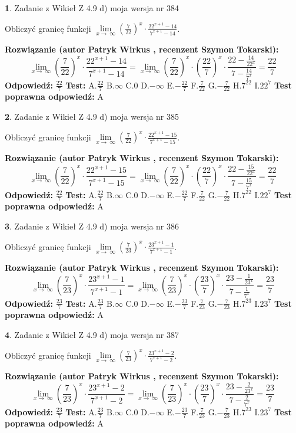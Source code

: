 \documentclass[12pt, a4paper]{article}
\theoremstyle{definition} %
\newtheorem{zad}{}
\newcommand{\zadStart}[1]{\begin{zad}#1\newline}
\newcommand{\zadStop}{\end{zad}}
\newcommand{\rozwStart}[2]{\noindent \textbf{Rozwiązanie (autor #1 , recenzent #2): }\newline}
\newcommand{\rozwStop}{\newline}
\newcommand{\odpStart}{\noindent \textbf{Odpowiedź:}\newline}
\newcommand{\odpStop}{\newline}
\newcommand{\testStart}{\noindent \textbf{Test:}\newline}
\newcommand{\testStop}{\newline}
\newcommand{\kluczStart}{\noindent \textbf{Test poprawna odpowiedź:}\newline}
\newcommand{\kluczStop}{\newline}
\begin{document}
\zadStart{Zadanie z Wikieł Z 4.9 d) moja wersja nr 384}


Obliczyć granicę funkcji  $\lim\limits_{x\to\ \infty}(\frac{7}{22})^{x}\cdot\frac{22^{x+1}-14}{7^{x+1}-14}$.
\zadStop
\rozwStart{Patryk Wirkus}{Szymon Tokarski}
$$\lim\limits_{x\to\ \infty}(\frac{7}{22})^{x}\cdot\frac{22^{x+1}-14}{7^{x+1}-14}=\lim\limits_{x\to\ \infty}(\frac{7}{22})^{x}\cdot(\frac{22}{7})^{x} \cdot \frac{22-\frac{14}{22^{x}}}{7-\frac{14}{7^{x}}} = \frac{22}{7}$$
\rozwStop
\odpStart
$\frac{22}{7}$
\odpStop
\testStart
A.$\frac{22}{7}$ B.$\infty$ C.$0$ D.$-\infty$ E.$-\frac{22}{7}$
F.$\frac{7}{22}$ G.$-\frac{7}{22}$
H.$7^{22}$
I.$22^{7}$
\testStop
\kluczStart
A
\kluczStop



\zadStart{Zadanie z Wikieł Z 4.9 d) moja wersja nr 385}


Obliczyć granicę funkcji  $\lim\limits_{x\to\ \infty}(\frac{7}{22})^{x}\cdot\frac{22^{x+1}-15}{7^{x+1}-15}$.
\zadStop
\rozwStart{Patryk Wirkus}{Szymon Tokarski}
$$\lim\limits_{x\to\ \infty}(\frac{7}{22})^{x}\cdot\frac{22^{x+1}-15}{7^{x+1}-15}=\lim\limits_{x\to\ \infty}(\frac{7}{22})^{x}\cdot(\frac{22}{7})^{x} \cdot \frac{22-\frac{15}{22^{x}}}{7-\frac{15}{7^{x}}} = \frac{22}{7}$$
\rozwStop
\odpStart
$\frac{22}{7}$
\odpStop
\testStart
A.$\frac{22}{7}$ B.$\infty$ C.$0$ D.$-\infty$ E.$-\frac{22}{7}$
F.$\frac{7}{22}$ G.$-\frac{7}{22}$
H.$7^{22}$
I.$22^{7}$
\testStop
\kluczStart
A
\kluczStop



\zadStart{Zadanie z Wikieł Z 4.9 d) moja wersja nr 386}


Obliczyć granicę funkcji  $\lim\limits_{x\to\ \infty}(\frac{7}{23})^{x}\cdot\frac{23^{x+1}-1}{7^{x+1}-1}$.
\zadStop
\rozwStart{Patryk Wirkus}{Szymon Tokarski}
$$\lim\limits_{x\to\ \infty}(\frac{7}{23})^{x}\cdot\frac{23^{x+1}-1}{7^{x+1}-1}=\lim\limits_{x\to\ \infty}(\frac{7}{23})^{x}\cdot(\frac{23}{7})^{x} \cdot \frac{23-\frac{1}{23^{x}}}{7-\frac{1}{7^{x}}} = \frac{23}{7}$$
\rozwStop
\odpStart
$\frac{23}{7}$
\odpStop
\testStart
A.$\frac{23}{7}$ B.$\infty$ C.$0$ D.$-\infty$ E.$-\frac{23}{7}$
F.$\frac{7}{23}$ G.$-\frac{7}{23}$
H.$7^{23}$
I.$23^{7}$
\testStop
\kluczStart
A
\kluczStop



\zadStart{Zadanie z Wikieł Z 4.9 d) moja wersja nr 387}


Obliczyć granicę funkcji  $\lim\limits_{x\to\ \infty}(\frac{7}{23})^{x}\cdot\frac{23^{x+1}-2}{7^{x+1}-2}$.
\zadStop
\rozwStart{Patryk Wirkus}{Szymon Tokarski}
$$\lim\limits_{x\to\ \infty}(\frac{7}{23})^{x}\cdot\frac{23^{x+1}-2}{7^{x+1}-2}=\lim\limits_{x\to\ \infty}(\frac{7}{23})^{x}\cdot(\frac{23}{7})^{x} \cdot \frac{23-\frac{2}{23^{x}}}{7-\frac{2}{7^{x}}} = \frac{23}{7}$$
\rozwStop
\odpStart
$\frac{23}{7}$
\odpStop
\testStart
A.$\frac{23}{7}$ B.$\infty$ C.$0$ D.$-\infty$ E.$-\frac{23}{7}$
F.$\frac{7}{23}$ G.$-\frac{7}{23}$
H.$7^{23}$
I.$23^{7}$
\testStop
\kluczStart
A
\kluczStop
\end{document}
